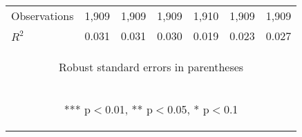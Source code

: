 \begin{center}
\begin{tabular}{lcccccc}
Observations & 1,909 & 1,909 & 1,909 & 1,910 & 1,909 & 1,909 \\
 $R^2$ & 0.031 & 0.031 & 0.030 & 0.019 & 0.023 & 0.027 \\ \hline
\multicolumn{7}{c}{\begin{footnotesize} Robust standard errors in parentheses\end{footnotesize}} \\
\multicolumn{7}{c}{\begin{footnotesize} *** p$<$0.01, ** p$<$0.05, * p$<$0.1\end{footnotesize}} \\
\end{tabular}
\end{center}
